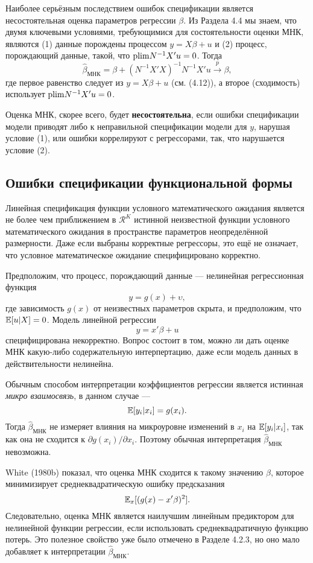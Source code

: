 Наиболее серьёзным последствием ошибок спецификации является несостоятельная оценка параметров регрессии $\beta$. Из Раздела 4.4 мы знаем, что двумя ключевыми условиями, требующимися для состоятельности оценки МНК, являются (1) данные порождены процессом $y = X\beta+u$ и (2) процесс, порождающий данные, такой, что $\mathrm{plim } N^{-1}X'u=0$. Тогда
\begin{equation}
\hat{\beta}_{\text{МНК}}=\beta + (N^{-1}X'X)^{-1}N^{-1}X'u \xrightarrow{p} \beta,
\end{equation}
где первое равенство следует из  $y = X\beta+u$ (см. (4.12)), а второе (сходимость) использует $\mathrm{plim } N^{-1}X'u=0$.

Оценка МНК, скорее всего, будет \textbf{несостоятельна}, если ошибки спецификации модели приводят либо к неправильной спецификации модели для $y$, нарушая условие (1), или ошибки коррелируют с регрессорами, так, что нарушается условие (2).

\subsection{Ошибки спецификации функциональной формы}

Линейная спецификация функции условного математического ожидания является не более чем приближением в $\mathcal{R}^K$ истинной неизвестной функции условного математического ожидания в пространстве параметров неопределённой размерности. Даже если выбраны корректные регрессоры, это ещё не означает, что условное математическое ожидание специфицировано корректно.

Предположим, что процесс, порождающий данные --- нелинейная регрессионная функция 
$$ y = g(x) + \upsilon, $$
где зависимость $g(x)$ от неизвестных параметров скрыта, и предположим, что $\mathbb{E}[u|X] = 0$. Модель линейной регрессии
$$ y = x'\beta +u$$
специфицирована некорректно. Вопрос состоит в том, можно ли дать оценке МНК какую-либо содержательную интерпертацию, даже если модель данных в действительности нелинейна.

Обычным способом интерпретации коэффициентов регрессии является истинная \textit{микро взаимосвязь}, в данном случае ---
$$\mathbb{E}[y_i|x_i] = g(x_i).$$
Тогда $\hat{\beta}_{\text{МНК}}$ не измеряет влияния на микроуровне изменений в $x_i$ на $\mathbb{E}[y_i|x_i]$, так как она не сходится к $\partial g(x_i)/\partial x_i$. Поэтому обычная интерпретация $\hat{\beta}_{\text{МНК}}$ невозможна.

White (1980b) показал, что оценка МНК сходится к такому значению $\beta$, которое минимизирует среднеквадратическую ошибку предсказания
$$\mathbb{E}_x[(g(x)-x'\beta)^2].$$
Следовательно, оценка МНК является наилучшим линейным предиктором для нелинейной функции регрессии, если использовать среднеквадратичную функцию потерь. Это полезное свойство уже было отмечено в Разделе 4.2.3, но оно мало добавляет к интерпретации $\hat{\beta}_{\text{МНК}}$.

